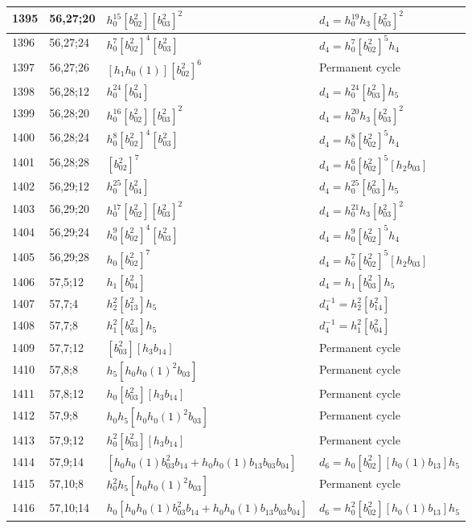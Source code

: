 \documentclass{article}
\begin{document}
\begin{longtable}{|l|l|>{\raggedright\arraybackslash}p{6cm}|>{\raggedright\arraybackslash}p{6cm}|}
\hline
1395 & 56,27;20 & $h_0^{15}[b_{02}^2][b_{03}^2]^2$ &$d_{4}=h_0^{19}h_3[b_{03}^2]^2$\\
\hline
1396 & 56,27;24 & $h_0^7[b_{02}^2]^4[b_{03}^2]$ &$d_{4}=h_0^7[b_{02}^2]^5h_4$\\
\hline
1397 & 56,27;26 & $[h_1h_0(1)][b_{02}^2]^6$ & Permanent cycle\\
\hline
1398 & 56,28;12 & $h_0^{24}[b_{04}^2]$ &$d_{4}=h_0^{24}[b_{03}^2]h_5$\\
\hline
1399 & 56,28;20 & $h_0^{16}[b_{02}^2][b_{03}^2]^2$ &$d_{4}=h_0^{20}h_3[b_{03}^2]^2$\\
\hline
1400 & 56,28;24 & $h_0^8[b_{02}^2]^4[b_{03}^2]$ &$d_{4}=h_0^8[b_{02}^2]^5h_4$\\
\hline
1401 & 56,28;28 & $[b_{02}^2]^7$ &$d_{4}=h_0^6[b_{02}^2]^5[h_2b_{03}]$\\
\hline
1402 & 56,29;12 & $h_0^{25}[b_{04}^2]$ &$d_{4}=h_0^{25}[b_{03}^2]h_5$\\
\hline
1403 & 56,29;20 & $h_0^{17}[b_{02}^2][b_{03}^2]^2$ &$d_{4}=h_0^{21}h_3[b_{03}^2]^2$\\
\hline
1404 & 56,29;24 & $h_0^9[b_{02}^2]^4[b_{03}^2]$ &$d_{4}=h_0^9[b_{02}^2]^5h_4$\\
\hline
1405 & 56,29;28 & $h_0[b_{02}^2]^7$ &$d_{4}=h_0^7[b_{02}^2]^5[h_2b_{03}]$\\
\hline
1406 & 57,5;12 & $h_1[b_{04}^2]$ &$d_{4}=h_1[b_{03}^2]h_5$\\
\hline
1407 & 57,7;4 & $h_2^2[b_{13}^2]h_5$ & $d_{4}^{-1}=h_2^2[b_{14}^2]$\\
\hline
1408 & 57,7;8 & $h_1^2[b_{03}^2]h_5$ & $d_{4}^{-1}=h_1^2[b_{04}^2]$\\
\hline
1409 & 57,7;12 & $[b_{03}^2][h_3b_{14}]$ & Permanent cycle\\
\hline
1410 & 57,8;8 & $h_5[h_0h_0(1)^2b_{03}]$ & Permanent cycle\\
\hline
1411 & 57,8;12 & $h_0[b_{03}^2][h_3b_{14}]$ & Permanent cycle\\
\hline
1412 & 57,9;8 & $h_0h_5[h_0h_0(1)^2b_{03}]$ & Permanent cycle\\
\hline
1413 & 57,9;12 & $h_0^2[b_{03}^2][h_3b_{14}]$ & Permanent cycle\\
\hline
1414 & 57,9;14 & $[h_0h_0(1)b_{03}^2b_{14} + h_0h_0(1)b_{13}b_{03}b_{04}]$ &$d_{6}=h_0[b_{02}^2][h_0(1)b_{13}]h_5$\\
\hline
1415 & 57,10;8 & $h_0^2h_5[h_0h_0(1)^2b_{03}]$ & Permanent cycle\\
\hline
1416 & 57,10;14 & $h_0[h_0h_0(1)b_{03}^2b_{14} + h_0h_0(1)b_{13}b_{03}b_{04}]$ &$d_{6}=h_0^2[b_{02}^2][h_0(1)b_{13}]h_5$\\

\end{longtable}
\end{document}
